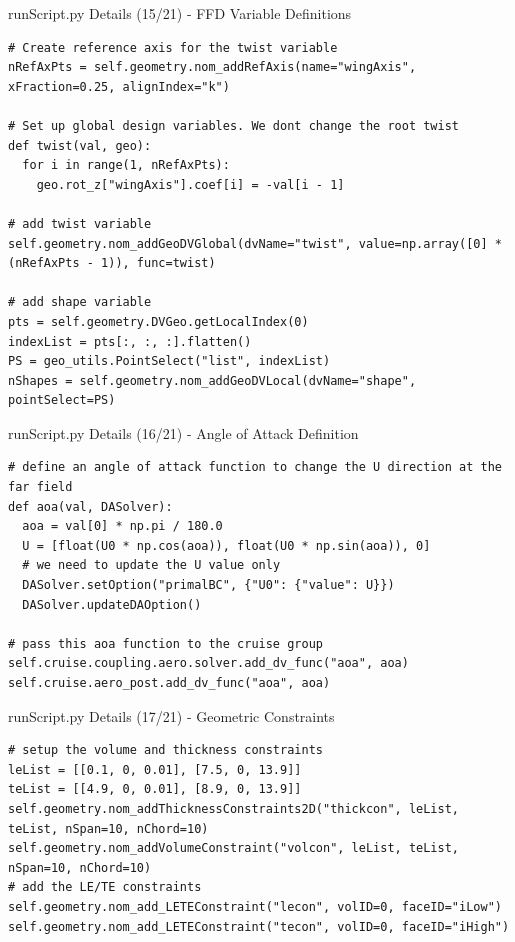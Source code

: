 \documentclass{bredelebeamer}
\begin{document}
\begin{frame}[fragile]{runScript.py Details (15/21) - \large FFD Variable Definitions}
  \scriptsize
\lstset{ language=bash }
\begin{lstlisting}
# Create reference axis for the twist variable
nRefAxPts = self.geometry.nom_addRefAxis(name="wingAxis", xFraction=0.25, alignIndex="k")

# Set up global design variables. We dont change the root twist
def twist(val, geo):
  for i in range(1, nRefAxPts):
    geo.rot_z["wingAxis"].coef[i] = -val[i - 1]

# add twist variable
self.geometry.nom_addGeoDVGlobal(dvName="twist", value=np.array([0] * (nRefAxPts - 1)), func=twist)

# add shape variable
pts = self.geometry.DVGeo.getLocalIndex(0)
indexList = pts[:, :, :].flatten()
PS = geo_utils.PointSelect("list", indexList)
nShapes = self.geometry.nom_addGeoDVLocal(dvName="shape", pointSelect=PS)
\end{lstlisting}
\normalsize
\end{frame}

\begin{frame}[fragile]{runScript.py Details (16/21) - \large Angle of Attack Definition}
\scriptsize
\lstset{ language=bash }
\begin{lstlisting}
# define an angle of attack function to change the U direction at the far field
def aoa(val, DASolver):
  aoa = val[0] * np.pi / 180.0
  U = [float(U0 * np.cos(aoa)), float(U0 * np.sin(aoa)), 0]
  # we need to update the U value only
  DASolver.setOption("primalBC", {"U0": {"value": U}})
  DASolver.updateDAOption()

# pass this aoa function to the cruise group
self.cruise.coupling.aero.solver.add_dv_func("aoa", aoa)
self.cruise.aero_post.add_dv_func("aoa", aoa)
\end{lstlisting}
\normalsize
\end{frame}

\begin{frame}[fragile]{runScript.py Details (17/21) - \large Geometric Constraints}
\scriptsize
\lstset{ language=bash }
\begin{lstlisting}
# setup the volume and thickness constraints
leList = [[0.1, 0, 0.01], [7.5, 0, 13.9]]
teList = [[4.9, 0, 0.01], [8.9, 0, 13.9]]
self.geometry.nom_addThicknessConstraints2D("thickcon", leList, teList, nSpan=10, nChord=10)
self.geometry.nom_addVolumeConstraint("volcon", leList, teList, nSpan=10, nChord=10)
# add the LE/TE constraints
self.geometry.nom_add_LETEConstraint("lecon", volID=0, faceID="iLow")
self.geometry.nom_add_LETEConstraint("tecon", volID=0, faceID="iHigh")
\end{lstlisting}
\normalsize
\end{frame}
\end{document}
